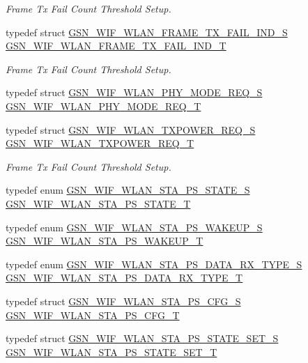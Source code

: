 \begin{DoxyCompactItemize}
\begin{DoxyCompactList}\small\item\em Frame Tx Fail Count Threshold Setup. \end{DoxyCompactList}\item 
typedef struct \hyperlink{a00382}{GSN\_\-WIF\_\-WLAN\_\-FRAME\_\-TX\_\-FAIL\_\-IND\_\-S} \hyperlink{a00677_ga72cc751c5634b432dbd748e5760ba9c3}{GSN\_\-WIF\_\-WLAN\_\-FRAME\_\-TX\_\-FAIL\_\-IND\_\-T}
\begin{DoxyCompactList}\small\item\em Frame Tx Fail Count Threshold Setup. \end{DoxyCompactList}\item 
typedef struct \hyperlink{a00393}{GSN\_\-WIF\_\-WLAN\_\-PHY\_\-MODE\_\-REQ\_\-S} \hyperlink{a00677_gad732cb7dd018272c31146ba48ee6e657}{GSN\_\-WIF\_\-WLAN\_\-PHY\_\-MODE\_\-REQ\_\-T}
\item 
typedef struct \hyperlink{a00411}{GSN\_\-WIF\_\-WLAN\_\-TXPOWER\_\-REQ\_\-S} \hyperlink{a00677_ga23625516479d19d7b54f0771fdacec4a}{GSN\_\-WIF\_\-WLAN\_\-TXPOWER\_\-REQ\_\-T}
\begin{DoxyCompactList}\small\item\em Frame Tx Fail Count Threshold Setup. \end{DoxyCompactList}\item 
typedef enum \hyperlink{a00677_gacdd46642c1bc32323d14e63794ffc1b3}{GSN\_\-WIF\_\-WLAN\_\-STA\_\-PS\_\-STATE\_\-S} \hyperlink{a00677_gaa2a092592d015a1963ac4736c11084d5}{GSN\_\-WIF\_\-WLAN\_\-STA\_\-PS\_\-STATE\_\-T}
\item 
typedef enum \hyperlink{a00677_ga37d0f17a3334d0645a337ca71c7c9bcb}{GSN\_\-WIF\_\-WLAN\_\-STA\_\-PS\_\-WAKEUP\_\-S} \hyperlink{a00677_ga87b10edb516da9c03dd06234ee6d7fd5}{GSN\_\-WIF\_\-WLAN\_\-STA\_\-PS\_\-WAKEUP\_\-T}
\item 
typedef enum \hyperlink{a00677_ga28466fa12055a0a4209a8280d845b52e}{GSN\_\-WIF\_\-WLAN\_\-STA\_\-PS\_\-DATA\_\-RX\_\-TYPE\_\-S} \hyperlink{a00677_ga7e3a091c3528831ca0870a266e284513}{GSN\_\-WIF\_\-WLAN\_\-STA\_\-PS\_\-DATA\_\-RX\_\-TYPE\_\-T}
\item 
typedef struct \hyperlink{a00403}{GSN\_\-WIF\_\-WLAN\_\-STA\_\-PS\_\-CFG\_\-S} \hyperlink{a00677_gabf94d7933715cf79cb8890c7204e13d9}{GSN\_\-WIF\_\-WLAN\_\-STA\_\-PS\_\-CFG\_\-T}
\item 
typedef struct \hyperlink{a00405}{GSN\_\-WIF\_\-WLAN\_\-STA\_\-PS\_\-STATE\_\-SET\_\-S} \hyperlink{a00677_ga5aa8c0c0f00f05050a28edaeac02c38f}{GSN\_\-WIF\_\-WLAN\_\-STA\_\-PS\_\-STATE\_\-SET\_\-T}

\end{DoxyCompactItemize}
